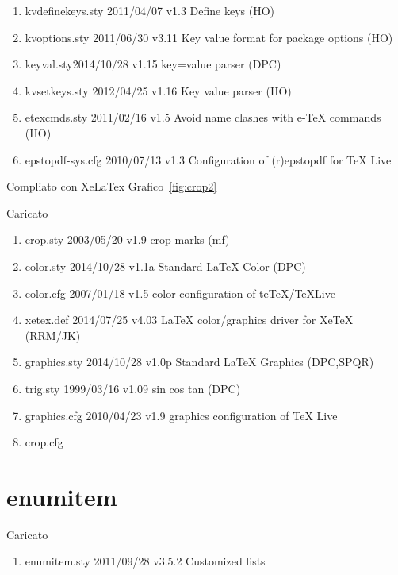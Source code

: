 \begin{enumerate}
\item kvdefinekeys.sty 2011/04/07 v1.3 Define keys (HO)
\item kvoptions.sty 2011/06/30 v3.11 Key value format for package options (HO)
\item keyval.sty2014/10/28 v1.15 key=value parser (DPC)
\item kvsetkeys.sty 2012/04/25 v1.16 Key value parser (HO)
\item etexcmds.sty 2011/02/16 v1.5 Avoid name clashes with e-TeX commands (HO)
\item epstopdf-sys.cfg 2010/07/13 v1.3 Configuration of (r)epstopdf for TeX Live
\end{enumerate}
Compliato con XeLaTex
Grafico~\vref{fig:crop2}

Caricato 
\begin{enumerate}
   \item crop.sty    2003/05/20 v1.9 crop marks (mf)
\item    color.sty    2014/10/28 v1.1a Standard LaTeX Color (DPC)
\item    color.cfg    2007/01/18 v1.5 color configuration of teTeX/TeXLive
\item    xetex.def    2014/07/25 v4.03 LaTeX color/graphics driver for XeTeX (RRM/JK)
   
\item    graphics.sty    2014/10/28 v1.0p Standard LaTeX Graphics (DPC,SPQR)
\item    trig.sty    1999/03/16 v1.09 sin cos tan (DPC)
\item    graphics.cfg    2010/04/23 v1.9 graphics configuration of TeX Live
\item    crop.cfg 
\end{enumerate}
\section{enumitem}

Caricato 
\begin{enumerate}
\item enumitem.sty 2011/09/28 v3.5.2 Customized lists
\end{enumerate}
